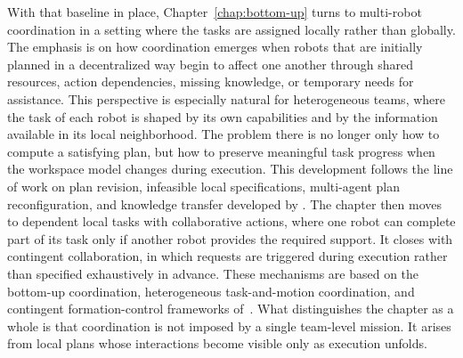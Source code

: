 With that baseline in place, Chapter~\ref{chap:bottom-up} turns to multi-robot
coordination in a setting where the tasks are assigned locally rather than
globally. The emphasis is on how coordination emerges when robots that are
initially planned in a decentralized way begin to affect one another through
shared resources, action dependencies, missing knowledge, or temporary needs
for assistance. This perspective is especially natural for heterogeneous
teams, where the task of each robot is shaped by its own capabilities and by
the information available in its local neighborhood.
 The problem there is no longer only how to compute
a satisfying plan, but how to preserve meaningful task progress when the
workspace model changes during execution. This development follows the line of
work on plan revision, infeasible local specifications, multi-agent plan
reconfiguration, and knowledge transfer developed by
\citet{guo2013revising,guo2012infeasible,guo2015multi,guo2014distributed}.
The chapter then moves to dependent local tasks with collaborative actions,
where one robot can complete part of its task only if another robot provides
the required support. It closes with contingent collaboration, in which
requests are triggered during execution rather than specified exhaustively in
advance. These mechanisms are based on the bottom-up coordination,
heterogeneous task-and-motion coordination, and contingent formation-control
frameworks of~\citet{guo2015bottom,guo2016task,guo2017hybrid}. What
distinguishes the chapter as a whole is that coordination is not imposed by a
single team-level mission. It arises from local plans whose interactions become
visible only as execution unfolds.

\subsection{}
\label{sec:ch01:outline:topdown}

